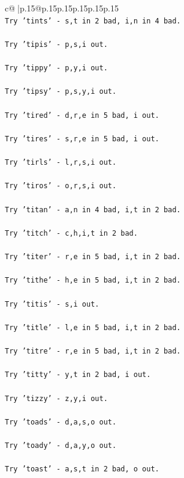 \documentclass{article}
\begin{document}
{\begin{supertabular}{c@{$\;$}|p{.15\linewidth}@{}p{.15\linewidth}p{.15\linewidth}p{.15\linewidth}p{.15\linewidth}p{.15\linewidth}}
{{{\\ 
\texttt{Try 'tints' {-} s,t in 2 bad, i,n in 4 bad.} \\
\\ 
\texttt{Try 'tipis' {-} p,s,i out.} \\
\\ 
\texttt{Try 'tippy' {-} p,y,i out.} \\
\\ 
\texttt{Try 'tipsy' {-} p,s,y,i out.} \\
\\ 
\texttt{Try 'tired' {-} d,r,e in 5 bad, i out.} \\
\\ 
\texttt{Try 'tires' {-} s,r,e in 5 bad, i out.} \\
\\ 
\texttt{Try 'tirls' {-} l,r,s,i out.} \\
\\ 
\texttt{Try 'tiros' {-} o,r,s,i out.} \\
\\ 
\texttt{Try 'titan' {-} a,n in 4 bad, i,t in 2 bad.} \\
\\ 
\texttt{Try 'titch' {-} c,h,i,t in 2 bad.} \\
\\ 
\texttt{Try 'titer' {-} r,e in 5 bad, i,t in 2 bad.} \\
\\ 
\texttt{Try 'tithe' {-} h,e in 5 bad, i,t in 2 bad.} \\
\\ 
\texttt{Try 'titis' {-} s,i out.} \\
\\ 
\texttt{Try 'title' {-} l,e in 5 bad, i,t in 2 bad.} \\
\\ 
\texttt{Try 'titre' {-} r,e in 5 bad, i,t in 2 bad.} \\
\\ 
\texttt{Try 'titty' {-} y,t in 2 bad, i out.} \\
\\ 
\texttt{Try 'tizzy' {-} z,y,i out.} \\
\\ 
\texttt{Try 'toads' {-} d,a,s,o out.} \\
\\ 
\texttt{Try 'toady' {-} d,a,y,o out.} \\
\\ 
\texttt{Try 'toast' {-} a,s,t in 2 bad, o out.} \\
}}}
\end{supertabular}}
\end{document}
